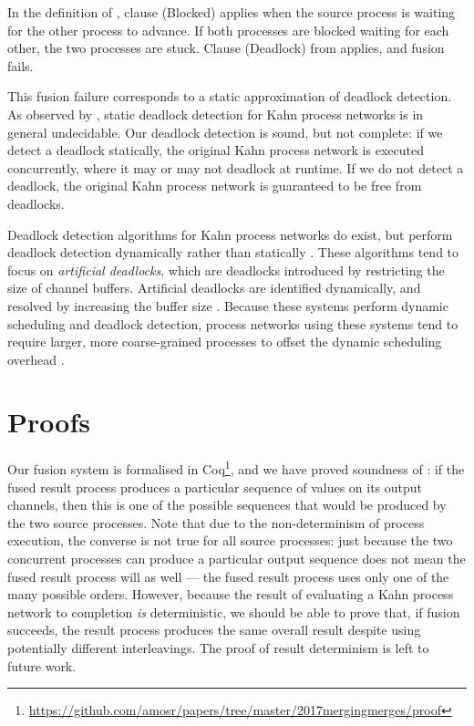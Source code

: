 In the definition of , clause (Blocked) applies when the source process is waiting for the other process to advance.
If both processes are blocked waiting for each other, the two processes are stuck.
Clause (Deadlock) from  applies, and fusion fails.

This fusion failure corresponds to a static approximation of deadlock detection.
As observed by \citet{buck1993scheduling}, static deadlock detection for Kahn process networks is in general undecidable.
Our deadlock detection is sound, but not complete: if we detect a deadlock statically, the original Kahn process network is executed concurrently, where it may or may not deadlock at runtime.
If we do not detect a deadlock, the original Kahn process network is guaranteed to be free from deadlocks.

Deadlock detection algorithms for Kahn process networks do exist, but perform deadlock detection dynamically rather than statically \citep{allen2007distributed,jiang2008hierarchical}.
These algorithms tend to focus on \emph{artificial deadlocks}, which are deadlocks introduced by restricting the size of channel buffers.
Artificial deadlocks are identified dynamically, and resolved by increasing the buffer size \citep{geilen2003requirements,parks1995bounded}.
Because these systems perform dynamic scheduling and deadlock detection, process networks using these systems tend to require larger, more coarse-grained processes to offset the dynamic scheduling overhead \citep{chen1990impact}.


% 






\section{Proofs}
\label{s:Proofs}

Our fusion system is formalised in Coq\footnote{\url{https://github.com/amosr/papers/tree/master/2017mergingmerges/proof}}, and we have proved soundness of : if the fused result process produces a particular sequence of values on its output channels, then this is one of the possible sequences that would be produced by the two source processes.
Note that due to the non-determinism of process execution, the converse is not true for all source processes: just because the two concurrent processes can produce a particular output sequence does not mean the fused result process will as well --- the fused result process uses only one of the many possible orders.
However, because the result of evaluating a Kahn process network to completion \emph{is} deterministic, we should be able to prove that, if fusion succeeds, the result process produces the same overall result despite using potentially different interleavings.
The proof of result determinism is left to future work.

